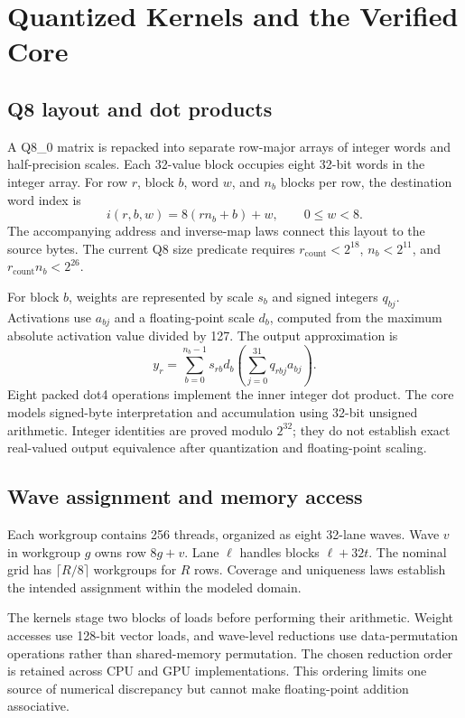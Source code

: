 \documentclass[10pt]{article}
\begin{document}
\section{Quantized Kernels and the Verified Core}
\subsection{Q8 layout and dot products}
A Q8\_0 matrix is repacked into separate row-major arrays of integer words and half-precision scales. Each 32-value block occupies eight 32-bit words in the integer array. For row $r$, block $b$, word $w$, and $n_b$ blocks per row, the destination word index is
\begin{equation}
 i(r,b,w)=8(rn_b+b)+w,\qquad 0\leq w<8.
\end{equation}
The accompanying address and inverse-map laws connect this layout to the source bytes. The current Q8 size predicate requires $r_{\mathrm{count}}<2^{18}$, $n_b<2^{11}$, and $r_{\mathrm{count}}n_b<2^{26}$.

For block $b$, weights are represented by scale $s_b$ and signed integers $q_{bj}$. Activations use $a_{bj}$ and a floating-point scale $d_b$, computed from the maximum absolute activation value divided by 127. The output approximation is
\begin{equation}
 y_r=\sum_{b=0}^{n_b-1}s_{rb}d_b
       \left(\sum_{j=0}^{31}q_{rbj}a_{bj}\right).
\end{equation}
Eight packed dot4 operations implement the inner integer dot product. The core models signed-byte interpretation and accumulation using 32-bit unsigned arithmetic. Integer identities are proved modulo $2^{32}$; they do not establish exact real-valued output equivalence after quantization and floating-point scaling.

\subsection{Wave assignment and memory access}
Each workgroup contains 256 threads, organized as eight 32-lane waves. Wave $v$ in workgroup $g$ owns row $8g+v$. Lane $\ell$ handles blocks $\ell+32t$. The nominal grid has $\lceil R/8\rceil$ workgroups for $R$ rows. Coverage and uniqueness laws establish the intended assignment within the modeled domain.

The kernels stage two blocks of loads before performing their arithmetic. Weight accesses use 128-bit vector loads, and wave-level reductions use data-permutation operations rather than shared-memory permutation. The chosen reduction order is retained across CPU and GPU implementations. This ordering limits one source of numerical discrepancy but cannot make floating-point addition associative.
\end{document}
